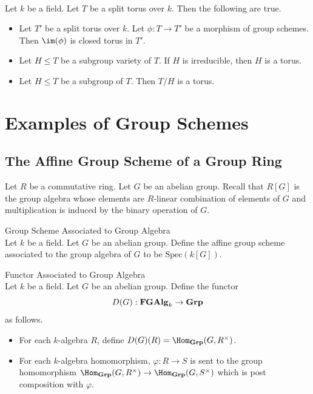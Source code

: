 \documentclass[a4paper]{article}
\begin{document}
\begin{prp}{}{}\\
Let $k$ be a field. Let $T$ be a split torus over $k$. Then the following are true. 
\begin{itemize}
\item Let $T'$ be a split torus over $k$. Let $\phi:T\to T'$ be a morphism of group schemes. Then $\im(\phi)$ is closed torus in $T'$. 
\item Let $H\leq T$ be a subgroup variety of $T$. If $H$ is irreducible, then $H$ is a torus. 
\item Let $H\leq T$ be a subgroup of $T$. Then $T/H$ is a torus. 
\end{itemize}
\end{prp}



\pagebreak
\section{Examples of Group Schemes}

\subsection{The Affine Group Scheme of a Group Ring}
Let $R$ be a commutative ring. Let $G$ be an abelian group. Recall that $R[G]$ is the group algebra whose elements are $R$-linear combination of elements of $G$ and multiplication is induced by the binary operation of $G$. 

\begin{defn}{Group Scheme Associated to Group Algebra}{}\\
Let $k$ be a field. Let $G$ be an abelian group. Define the affine group scheme associated to the group algebra of $G$ to be $\text{Spec}(k[G])$. 
\end{defn}

\begin{defn}{Functor Associated to Group Algebra}{}\\
Let $k$ be a field. Let $G$ be an abelian group. Define the functor $$D(G):\bold{FGAlg}_k\to\bold{Grp}$$ as follows. 
\begin{itemize}
\item For each $k$-algebra $R$, define $D(G)(R)=\Hom_{\bold{Grp}}(G,R^\times)$. 
\item For each $k$-algebra homomorphism, $\varphi:R\to S$ is sent to the group homomorphism $\Hom_{\bold{Grp}}(G,R^\times)\to\Hom_{\bold{Grp}}(G,S^\times)$ which is post composition with $\varphi$. 
\end{itemize}
\end{defn}
\end{document}
